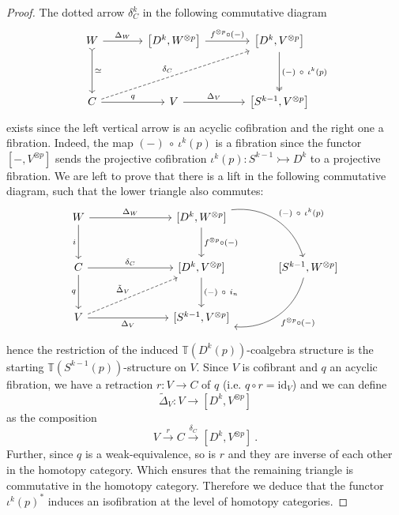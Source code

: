 \documentclass[a4paper,12pt]{amsart}
\theoremstyle{plain}
\theoremstyle{definition}
\theoremstyle{remark}
\begin{document}
\begin{proof}
The dotted arrow $\delta^k_C$ in the following commutative diagram
\[
\begin{tikzcd}[column sep=3pc,row sep=3pc]
W \arrow[d,rightarrowtail,"\simeq"] \arrow[r,"\Delta_W"] 
&\left[ D^k, W^{\otimes p}\right] \arrow[r,"f^{\otimes p} \circ (-)"]
&\left[ D^k, V^{\otimes p}\right] \arrow[d,"(-)~ \circ ~ \iota^k(p)",two heads] \\
C \arrow[r,"q"] \arrow[rru,"\delta_C",dashed]
&V \arrow[r,"\Delta_V"]
&\left[ S^{k-1},V^{\otimes p}\right]
\end{tikzcd}
\]
exists since the left vertical arrow is an acyclic cofibration and the right one a fibration. Indeed, the map $(-)~ \circ ~ \iota^k(p)$ is a fibration since the functor $\left[-,V^{\otimes p}\right]$ sends the projective cofibration $\iota^k(p): S^{k-1} \rightarrowtail D^k$ to a projective fibration. We are left to prove that there is a lift in the following commutative diagram, such that the lower triangle also commutes:
\[
\begin{tikzcd}[row sep=large, column sep=large]
W 
  \arrow[rr, "\Delta_W"] 
  \arrow[d, "i"'] 
&& {[D^k, W^{\otimes p}]} 
  \arrow[d, "f^{\otimes p}\circ (-)"] 
  \arrow[rd, "(-)~\circ ~\iota^k(p)", bend left=40] & \\
C 
  \arrow[d, "q"'] 
  \arrow[rr, "\delta_C"] 
&& {[D^k, V^{\otimes p}]} 
  \arrow[d, "(-)~\circ~i_n"] 
& {[S^{k-1}, W^{\otimes p}]} 
  \arrow[ld, "f^{\otimes p}\circ (-)", bend left=40] \\
V 
  \arrow[rr, "\Delta_V"'] 
  \arrow[urr, dashed, "\tilde{\Delta}_V"] 
&& {[S^{k-1}, V^{\otimes p}]}
\end{tikzcd}
\]

hence the restriction of the induced $\mathbb{T}(D^k(p))$-coalgebra structure is the starting $\mathbb{T}(S^{k-1}(p))$-structure on $V$. Since $V$ is cofibrant and $q$ an acyclic fibration, we have a retraction $r: V \longrightarrow C$ of $q$ (i.e. $q \circ r = \mathrm{id}_{V}$) and we can define 
\[
\tilde{\Delta}_V : V \longrightarrow \left[ D^k,V^{\otimes p} \right]
\]
as the composition 
\[ 
V\stackrel{r}\longrightarrow C \stackrel{\delta_C}\longrightarrow  \left[ D^k,V^{\otimes p}\right]~.
\]
Further, since $q$ is a weak-equivalence, so is $r$ and they are inverse of each other in the homotopy category. Which ensures that the remaining triangle is commutative in the homotopy category. Therefore we deduce that the functor $\iota^k(p)^*$ induces an isofibration at the level of homotopy categories.
\end{proof}
\end{document}
